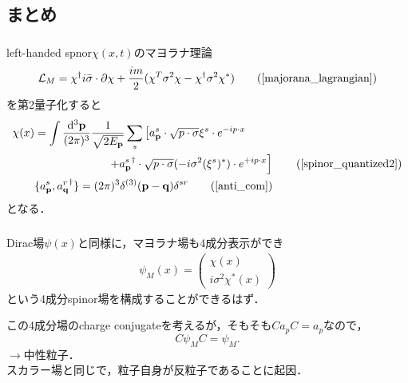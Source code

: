 \documentclass[pdflatex,unicode,ja=standard,12pt]{beamer}
\begin{document}
\subsection{まとめ}

\begin{frame}
  
  \frametitle{\subsecname}

  left-handed spnor$\chi(x,t)$のマヨラナ理論
  \begin{equation}
    \mathcal{L}_M
    =
    \chi^{\dag}i\bar{\sigma}\cdot\partial\chi
    +
    \frac{im}{2}
    (  
      \chi^{T}\sigma^2\chi
      -
      \chi^{\dag}\sigma^2\chi^{*}
    )
    \tag{\ref{majorana_lagrangian}}
  \end{equation}
  を第2量子化すると
  \begin{align}
    \chi(x)
    &=    
    \int\frac{\dd^3 \mathbf{p}}{(2\pi)^3}
    \frac{1}{\sqrt{2E_{\mathbf{p}}}}
    \sum_s
    \left[  
      a_{\mathbf{p}}^s \cdot \sqrt{p\cdot \sigma}\xi^s \cdot e^{-ip\cdot x}
    \right.
    \nonumber
    \\
    &\hspace{2.3cm}
    \left.
      +
      {a_{\mathbf{p}}^s}^{\dag} \cdot \sqrt{p\cdot \sigma}(-i\sigma^2(\xi^s)^{*}) \cdot e^{+ip\cdot x}
    \right]
    \tag{\ref{spinor_quantized2}}
    \\
    &
    \{
      a_{\mathbf{p}}^s
      ,
      {a_{\mathbf{q}}^r}^{\dag}
    \}
    =
    (2\pi)^{3}
    \delta^{(3)}(\mathbf{p}-\mathbf{q})\delta^{sr}
    \tag{\ref{anti_com}}
  \end{align}
  となる．
  
\end{frame}


\begin{frame}

  \frametitle{\subsecname}

  Dirac場$\psi(x)$と同様に，マヨラナ場も4成分表示ができ
  \begin{eqnarray}
    \psi_{M}(x)
    =
    \begin{pmatrix}
      \chi(x) \\
      i\sigma^2\chi^{\ast}(x)
    \end{pmatrix}
  \end{eqnarray}
  という4成分spinor場を構成することができるはず．

  この4成分場のcharge conjugateを考えるが，そもそも$Ca_pC=a_p$なので，
  \begin{equation}
    C\psi_MC
    =
    \psi_M
    .
  \end{equation}
  $\rightarrow$中性粒子．
  \\
  
  スカラー場と同じで，粒子自身が反粒子であることに起因．


\end{frame}
\end{document}
